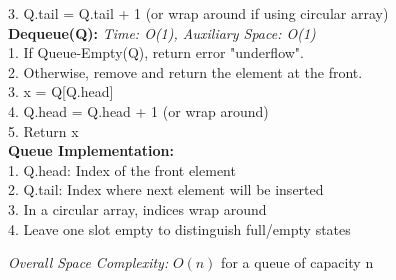 \documentclass[a4paper]{extarticle}
\begin{document}
\begin{paracol}{3}
{\begin{minipage}[t]{1\linewidth}
          3. Q.tail = Q.tail + 1 (or wrap around if using circular array)\\
          \textbf{Dequeue(Q):} \textit{Time: O(1), Auxiliary Space: O(1)}\\
          1. If Queue-Empty(Q), return error "underflow".\\
          2. Otherwise, remove and return the element at the front.\\
          3. x = Q[Q.head]\\
          4. Q.head = Q.head + 1 (or wrap around)\\
          5. Return x\\
          \textbf{Queue Implementation:}\\
          1. Q.head: Index of the front element\\
          2. Q.tail: Index where next element will be inserted\\
          3. In a circular array, indices wrap around\\
          4. Leave one slot empty to distinguish full/empty states
  
          \textit{Overall Space Complexity:} \(O(n)\) for a queue of capacity n
      \end{minipage}
  }


\end{paracol}
\end{document}
